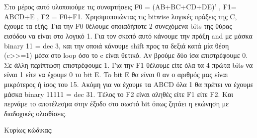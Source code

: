 \section{}
Στο μέρος αυτό υλοποιούμε τις συναρτήσεις F0 = (AB+BC+CD+DE)' , F1= ABCD+E ,
F2 = F0+F1.  Χρησιμοποιώντας τις bitwise λογικές πράξεις της C, έχουμε τα
εξής: Για την F0 θέλουμε οποιαδήποτε 2 συνεχόμενα bits της θύρας εισόδου να
είναι στο λογικό 1.  Για τον σκοπό αυτό κάνουμε την πράξη and με μάσκα binary
11 = dec 3, και την οποιά κάνουμε shift προς τα δεξιά κατά μία θέση (c>>=1)
μέσα στο loop όσο το c είναι θετικό. Αν βρούμε δύο ίσα επιστρέφουμε 0. Σε άλλη
περίπτωση επιστρέφουμε 1.  Για την F1 θέλουμε είτε όλα τα 4 πρώτα bits να
είναι 1 είτε να έχουμε 0 το bit E. To bit E θα είναι 0 αν ο αριθμός μας είναι
μικρότερος ή ίσος του 15.  Ακόμη για να έχουμε τα ABCD όλα 1 θα πρέπει να
έχουμε μάσκα binary 11111 = dec 31.  Τέλος το F2 είναι αληθές είτε  F1 είτε
F2. Και περνάμε το αποτέλεσμα στην έξοδο  στο σωστό bit όπως ζητάει η εκώνηση
με διαδοχικές ολισθίσεις.

\noindent Κυρίως κώδικας:
\inputminted[linenos,obeytabs,fontsize=\footnotesize]{c}{files/part2.c}
